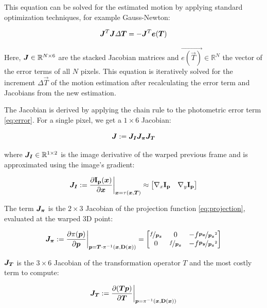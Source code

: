 This equation can be solved for the estimated motion by applying standard
optimization techniques, for example Gauss-Newton:

\begin{equation}
    \mat{J}^T \mat{J} \Delta \vec{T} = - \mat{J}^T \vec{e(\vec{T})}
\end{equation}

Here, $\mat{J} \in \mathbb{R}^{N \times 6}$ are the stacked Jacobian matrices
and $\vec{e(\vec{T})} \in \mathbb{R}^N$ the vector of the error terms of all
$N$ pixels.  This equation is iteratively solved for the increment $\Delta
\vec{T}$ of the motion estimation after recalculating the error term and
Jacobians from the new estimation.

The Jacobian is derived by applying the chain rule to the photometric error term \ref{eq:error}.
For a single pixel, we get a $1 \times 6$ Jacobian:

\begin{equation}
    \mat{J} := \mat{J_I} \mat{J_{\pi}} \mat{J_T}
\end{equation}

where $\mat{J_I} \in \mathbb{R}^{1 \times 2}$ is the image derivative of the warped previous frame and is
approximated using the image's gradient:

\begin{equation}
    \mat{J_I} := \frac{\partial \mathbf{I_p}(\vec{x})} {\partial \vec{x}} \bigg|_{\vec{x} = \tau(\vec{x}, \vec{T})}
    \approx
    \begin{bmatrix}
        \nabla{}_x \mathbf{I_p} & \nabla{}_y \mathbf{I_p}
    \end{bmatrix}
\end{equation}

The term $\mat{J_{\pi}}$ is the $2 \times 3$ Jacobian of the projection
function \ref{eq:projection}, evaluated at the warped 3D point:

\begin{equation}
    \mat{J_{\pi}} := \frac{\partial \pi(\vec{p})}{\partial \vec{p}}
    \bigg|_{\vec{p} = \vec{T}\cdot\pi^{-1}(\vec{x},\mathbf{D}(\vec{x}))}
    =
    \begin{bmatrix}
        \nicefrac{f}{\vec{p_z}} & 0 & -f \nicefrac{\vec{p_x}}{\vec{p_z}^2} \\
        0 & \nicefrac{f}{\vec{p_z}} & -f \nicefrac{\vec{p_y}}{\vec{p_z}^2}
    \end{bmatrix}
\end{equation}

$\mat{J_T}$ is the $3 \times 6$ Jacobian of the transformation operator $T$ and
the most costly term to compute:

\begin{equation}
    \mat{J_T} := \frac{\partial (\vec{T} \vec{p})}{\partial \vec{T}}
    \bigg|_{\vec{p} = \pi^{-1}(\vec{x}, \mathbf{D}(\vec{x}))}
\end{equation}
